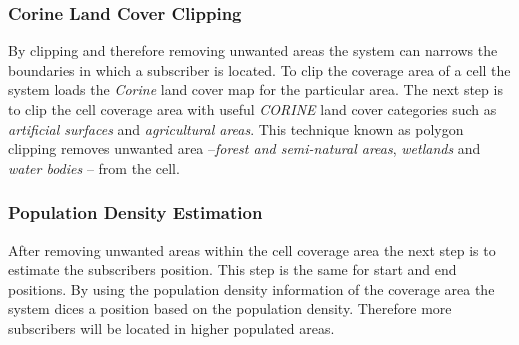 \subsubsection{Corine Land Cover Clipping}
By clipping and therefore removing unwanted areas the system can narrows the boundaries in which a subscriber is located. To clip the coverage area of a cell the system loads the \emph{Corine} land cover map for the particular area. The next step is to clip the cell coverage area with useful \emph{CORINE} land cover categories such as \emph{artificial surfaces} and \emph{agricultural areas}. This technique known as polygon clipping removes unwanted area --\emph{forest and semi-natural areas}, \emph{wetlands} and \emph{water bodies} -- from the cell.
\subsubsection{Population Density Estimation}
After removing unwanted areas within the cell coverage area the next step is to estimate the subscribers position. This step is the same for start and end positions. By using the population density information of the coverage area the system dices a position based on the population density. Therefore more subscribers will be located in higher populated areas.

